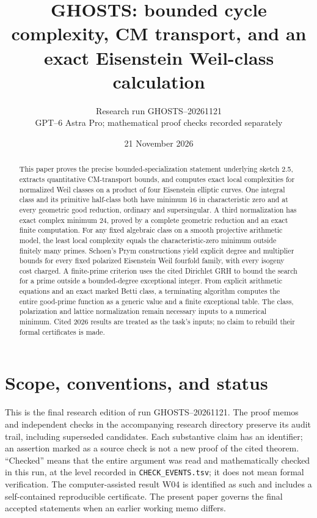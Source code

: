 \documentclass[11pt]{article}
\title{GHOSTS: bounded cycle complexity, CM transport, and an exact Eisenstein Weil-class calculation}
\author{Research run GHOSTS--20261121\\GPT--6 Astra Pro; mathematical proof checks recorded separately}
\date{21 November 2026}
\theoremstyle{remark}
\begin{document}
\maketitle
\begin{abstract}
This paper proves the precise bounded-specialization statement underlying sketch 2.5, extracts quantitative CM-transport bounds, and computes exact local complexities for normalized Weil classes on a product of four Eisenstein elliptic curves. One integral class and its primitive half-class both have minimum 16 in characteristic zero and at every geometric good reduction, ordinary and supersingular. A third normalization has exact complex minimum 24, proved by a complete geometric reduction and an exact finite computation. For any fixed algebraic class on a smooth projective arithmetic model, the least local complexity equals the characteristic-zero minimum outside finitely many primes. Schoen's Prym constructions yield explicit degree and multiplier bounds for every fixed polarized Eisenstein Weil fourfold family, with every isogeny cost charged. A finite-prime criterion uses the cited Dirichlet GRH to bound the search for a prime outside a bounded-degree exceptional integer. From explicit arithmetic equations and an exact marked Betti class, a terminating algorithm computes the entire good-prime function as a generic value and a finite exceptional table. The class, polarization and lattice normalization remain necessary inputs to a numerical minimum. Cited 2026 results are treated as the task's inputs; no claim to rebuild their formal certificates is made.
\end{abstract}
\tableofcontents
\section{Scope, conventions, and status}
This is the final research edition of run GHOSTS--20261121. The proof memos and independent checks in the accompanying research directory preserve its audit trail, including superseded candidates. Each substantive claim has an identifier; an assertion marked as a source check is not a new proof of the cited theorem. ``Checked'' means that the entire argument was read and mathematically checked in this run, at the level recorded in \texttt{CHECK\_EVENTS.tsv}; it does not mean formal verification. The computer-assisted result W04 is identified as such and includes a self-contained reproducible certificate. The present paper governs the final accepted statements when an earlier working memo differs.
\end{document}

